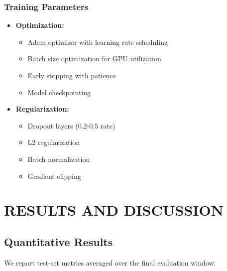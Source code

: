 \documentclass[12pt,a4paper]{report}
\begin{document}
\subsection{Training Parameters}
\begin{itemize}
\item \textbf{Optimization:}
  \begin{itemize}
    \item Adam optimizer with learning rate scheduling
    \item Batch size optimization for GPU utilization
    \item Early stopping with patience
    \item Model checkpointing
  \end{itemize}

\item \textbf{Regularization:}
  \begin{itemize}
    \item Dropout layers (0.2-0.5 rate)
    \item L2 regularization
    \item Batch normalization
    \item Gradient clipping
  \end{itemize}
\end{itemize}


\begin{table}[htbp]
\caption{Sample Table}
\vspace{0.5cm}
\end{table}


\chapter{RESULTS AND DISCUSSION}
\section{Quantitative Results}
We report test-set metrics averaged over the final evaluation window:
\end{document}
